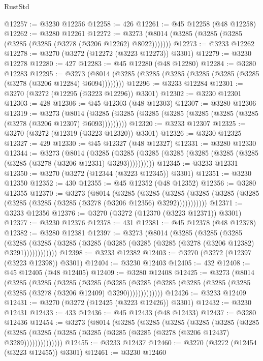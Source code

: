 \begin{lexlean}{RustStd}
\begin{coremodule}
@12257 := @3230 @12256
@12258 := 426
@12261 := @45 @12258 (@48 @12258)
@12262 := @3280 @12261
@12272 := @3273 (@8014 (@3285 (@3285 (@3285 (@3285 (@3285 (@3278 (@3206 @12262) @8022)))))))
@12273 := @3233 @12262
@12278 := @3270 (@3272 (@12272 (@3223 @12273)) @3301)
@12279 := @3230 @12278
@12280 := 427
@12283 := @45 @12280 (@48 @12280)
@12284 := @3280 @12283
@12295 := @3273 (@8014 (@3285 (@3285 (@3285 (@3285 (@3285 (@3285 (@3278 (@3206 @12284) @6094))))))))
@12296 := @3233 @12284
@12301 := @3270 (@3272 (@12295 (@3223 @12296)) @3301)
@12302 := @3230 @12301
@12303 := 428
@12306 := @45 @12303 (@48 @12303)
@12307 := @3280 @12306
@12319 := @3273
    (@8014 (@3285 (@3285 (@3285 (@3285 (@3285 (@3285 (@3285 (@3278 (@3206 @12307) @6093)))))))))
@12320 := @3233 @12307
@12325 := @3270 (@3272 (@12319 (@3223 @12320)) @3301)
@12326 := @3230 @12325
@12327 := 429
@12330 := @45 @12327 (@48 @12327)
@12331 := @3280 @12330
@12344 := @3273
    (@8014
      (@3285 (@3285 (@3285 (@3285 (@3285 (@3285 (@3285 (@3285 (@3278 (@3206 @12331) @3293))))))))))
@12345 := @3233 @12331
@12350 := @3270 (@3272 (@12344 (@3223 @12345)) @3301)
@12351 := @3230 @12350
@12352 := 430
@12355 := @45 @12352 (@48 @12352)
@12356 := @3280 @12355
@12370 := @3273
    (@8014
      (@3285
        (@3285
          (@3285 (@3285 (@3285 (@3285 (@3285 (@3285 (@3285 (@3278 (@3206 @12356) @3292)))))))))))
@12371 := @3233 @12356
@12376 := @3270 (@3272 (@12370 (@3223 @12371)) @3301)
@12377 := @3230 @12376
@12378 := 431
@12381 := @45 @12378 (@48 @12378)
@12382 := @3280 @12381
@12397 := @3273
    (@8014
      (@3285
        (@3285
          (@3285
            (@3285 (@3285 (@3285 (@3285 (@3285 (@3285 (@3285 (@3278 (@3206 @12382) @3291))))))))))))
@12398 := @3233 @12382
@12403 := @3270 (@3272 (@12397 (@3223 @12398)) @3301)
@12404 := @3230 @12403
@12405 := 432
@12408 := @45 @12405 (@48 @12405)
@12409 := @3280 @12408
@12425 := @3273
    (@8014
      (@3285
        (@3285
          (@3285
            (@3285
              (@3285
                (@3285 (@3285 (@3285 (@3285 (@3285 (@3285 (@3278 (@3206 @12409) @3290)))))))))))))
@12426 := @3233 @12409
@12431 := @3270 (@3272 (@12425 (@3223 @12426)) @3301)
@12432 := @3230 @12431
@12433 := 433
@12436 := @45 @12433 (@48 @12433)
@12437 := @3280 @12436
@12454 := @3273
    (@8014
      (@3285
        (@3285
          (@3285
            (@3285
              (@3285
                (@3285
                  (@3285
                    (@3285 (@3285 (@3285 (@3285 (@3285 (@3278 (@3206 @12437) @3289))))))))))))))
@12455 := @3233 @12437
@12460 := @3270 (@3272 (@12454 (@3223 @12455)) @3301)
@12461 := @3230 @12460

\end{coremodule}
\end{lexlean}
